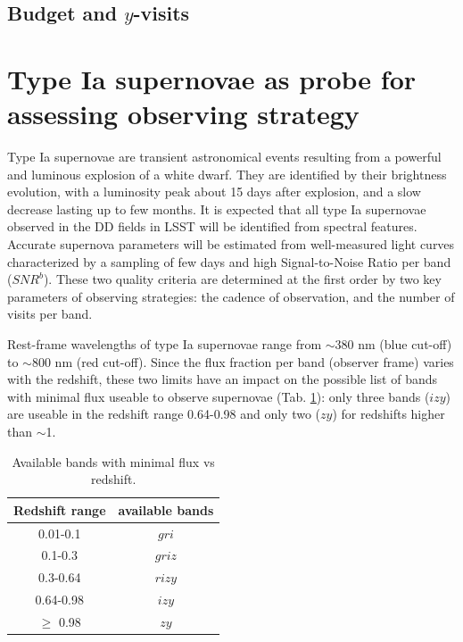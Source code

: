 \documentclass[\docopts]{\docclass}
\newcommand{\snrb}{\mbox{$SNR^b$}}
\newcommand{\bg}{{$g$}}
\newcommand{\br}{{$r$}}
\newcommand{\bi}{{$i$}}
\newcommand{\bz}{{$z$}}
\newcommand{\by}{{$y$}}
\begin{document}
\subsection{Budget and \by-visits}


\section{Type Ia supernovae as probe for assessing observing strategy}
\label{sec:snprobes}
Type Ia supernovae are transient astronomical events resulting from a powerful and luminous explosion of a white dwarf. They are identified by their brightness evolution, with a luminosity peak about 15 days after explosion, and a slow decrease lasting up to few months. It is expected that all type Ia supernovae observed in the DD fields in LSST will be identified from spectral features. Accurate supernova parameters will be estimated from well-measured light curves characterized by a sampling of few days and high Signal-to-Noise Ratio per band (\snrb). These two quality criteria are determined at the first order by two key parameters of observing strategies: the cadence of observation, and the number of visits per band.
\par
Rest-frame wavelengths of type Ia supernovae range from $\sim$380 nm (blue cut-off) to $\sim$800 nm (red cut-off). Since the flux fraction per band (observer frame) varies with the redshift, these two limits have an impact on the possible list of bands with minimal flux useable to observe supernovae (Tab. \ref{tab:zfilters}): only three bands (\bi\bz\by) are useable in the redshift range 0.64-0.98 and only two (\bz\by) for redshifts higher than $\sim$1. 

\begin{table}[!htbp]
  \caption{Available bands with minimal flux vs redshift.}\label{tab:zfilters}
  \begin{center}
    \begin{tabular}{c|c}
      \hline
      \hline
      Redshift range & available bands \\
      \hline
      0.01-0.1 & \bg\br\bi\\
      0.1-0.3 & \bg\br\bi\bz \\
      0.3-0.64 & \br\bi\bz\by \\
      0.64-0.98 & \bi\bz\by \\
      $\geq$ 0.98 & \bz\by \\
      \hline
      \end{tabular}
  \end{center}
\end{table}
\end{document}
